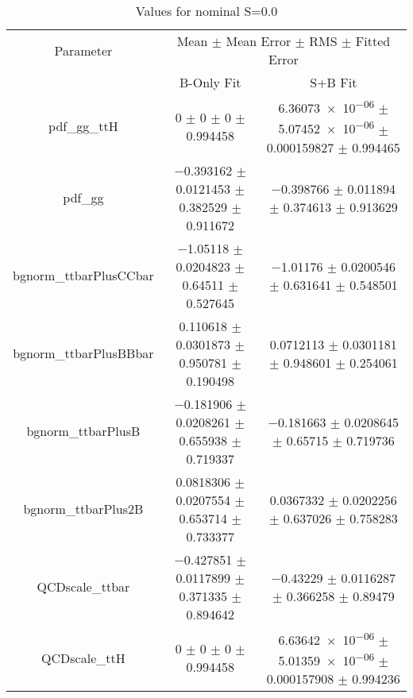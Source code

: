 \begin{table}
\centering
\caption{Values for nominal S=0.0}
\begin{tabular}{ccc}
\toprule
Parameter & \multicolumn{2}{c}{Mean $\pm$ Mean Error $\pm$ RMS $\pm$ Fitted Error}\\
 & B-Only Fit & S+B Fit\\
\midrule
pdf\_gg\_ttH & \num{0} $\pm$ \num{0} $\pm$ \num{0} $\pm$ \num{0.994458} & \num{6.36073e-06} $\pm$ \num{5.07452e-06} $\pm$ \num{0.000159827} $\pm$ \num{0.994465}\\
pdf\_gg & \num{-0.393162} $\pm$ \num{0.0121453} $\pm$ \num{0.382529} $\pm$ \num{0.911672} & \num{-0.398766} $\pm$ \num{0.011894} $\pm$ \num{0.374613} $\pm$ \num{0.913629}\\
bgnorm\_ttbarPlusCCbar & \num{-1.05118} $\pm$ \num{0.0204823} $\pm$ \num{0.64511} $\pm$ \num{0.527645} & \num{-1.01176} $\pm$ \num{0.0200546} $\pm$ \num{0.631641} $\pm$ \num{0.548501}\\
bgnorm\_ttbarPlusBBbar & \num{0.110618} $\pm$ \num{0.0301873} $\pm$ \num{0.950781} $\pm$ \num{0.190498} & \num{0.0712113} $\pm$ \num{0.0301181} $\pm$ \num{0.948601} $\pm$ \num{0.254061}\\
bgnorm\_ttbarPlusB & \num{-0.181906} $\pm$ \num{0.0208261} $\pm$ \num{0.655938} $\pm$ \num{0.719337} & \num{-0.181663} $\pm$ \num{0.0208645} $\pm$ \num{0.65715} $\pm$ \num{0.719736}\\
bgnorm\_ttbarPlus2B & \num{0.0818306} $\pm$ \num{0.0207554} $\pm$ \num{0.653714} $\pm$ \num{0.733377} & \num{0.0367332} $\pm$ \num{0.0202256} $\pm$ \num{0.637026} $\pm$ \num{0.758283}\\
QCDscale\_ttbar & \num{-0.427851} $\pm$ \num{0.0117899} $\pm$ \num{0.371335} $\pm$ \num{0.894642} & \num{-0.43229} $\pm$ \num{0.0116287} $\pm$ \num{0.366258} $\pm$ \num{0.89479}\\
QCDscale\_ttH & \num{0} $\pm$ \num{0} $\pm$ \num{0} $\pm$ \num{0.994458} & \num{6.63642e-06} $\pm$ \num{5.01359e-06} $\pm$ \num{0.000157908} $\pm$ \num{0.994236}\\
\bottomrule
\end{tabular}
\end{table}